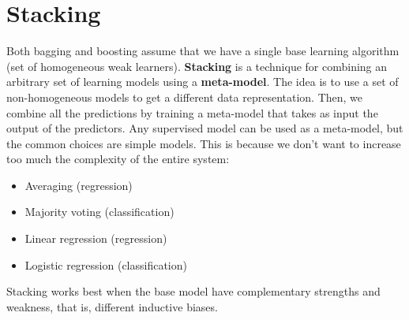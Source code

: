 \section{Stacking}
Both bagging and boosting assume that we have a single base learning algorithm (set of homogeneous weak learners). \textbf{Stacking} is a technique for combining an arbitrary set of learning models using a \textbf{meta-model}.\newline\newline
The idea is to use a set of non-homogeneous models to get a different data representation. Then, we combine all the predictions by training a meta-model that takes as input the output of the predictors.\newline\newline
Any supervised model can be used as a meta-model, but the common choices are simple models. This is because we don't want to increase too much the complexity of the entire system:
\begin{itemize}
    \item Averaging (regression)
    \item Majority voting (classification)
    \item Linear regression (regression)
    \item Logistic regression (classification)
\end{itemize}
Stacking works best when the base model have complementary strengths and weakness, that is, different inductive biases.
